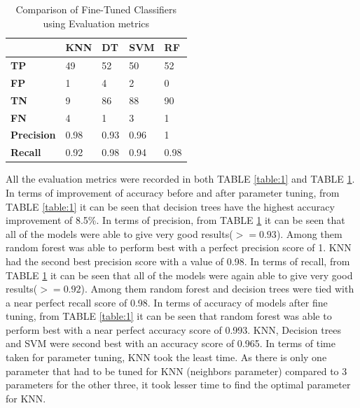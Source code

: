 \documentclass[journal]{IEEEtran}
\begin{document}
\begin{table}[htbp]
\centering
\setlength{\tabcolsep}{15pt}
\renewcommand{\arraystretch}{2}
\begin{tabular}{|l|l|l|l|l|}
\hline
                   & \textbf{KNN} & \textbf{DT} & \textbf{SVM} & \textbf{RF} \\ \hline
\textbf{TP}        & 49           & 52          & 50           & 52          \\ \hline
\textbf{FP}        & 1            & 4           & 2            & 0           \\ \hline
\textbf{TN}        & 9            & 86          & 88           & 90          \\ \hline
\textbf{FN}        & 4            & 1           & 3            & 1           \\ \hline
\textbf{Precision} & 0.98         & 0.93        & 0.96         & 1           \\ \hline
\textbf{Recall}    & 0.92         & 0.98        & 0.94         & 0.98        \\ \hline
\end{tabular}
\caption{Comparison of Fine-Tuned Classifiers using Evaluation metrics}
\label{table:2}
\end{table}

All the evaluation metrics were recorded in both TABLE \ref{table:1} and TABLE \ref{table:2}. In terms of improvement of accuracy before and after parameter tuning, from TABLE \ref{table:1} it can be seen that decision trees have the highest accuracy improvement of 8.5\%. In terms of precision, from TABLE \ref{table:2} it can be seen that all of the models were able to give very good results($>=0.93$). Among them random forest was able to perform best with a perfect precision score of 1. KNN had the second best precision score with a value of 0.98. In terms of recall, from TABLE \ref{table:2} it can be seen that all of the models were again able to give very good results($>=0.92$). Among them random forest and decision trees were tied with a near perfect recall score of 0.98. In terms of accuracy of models after fine tuning, from TABLE \ref{table:1} it can be seen that random forest was able to perform best with a near perfect accuracy score of 0.993. KNN, Decision trees and SVM were second best with an accuracy score of 0.965. In terms of time taken for parameter tuning, KNN took the least time. As there is only one parameter that had to be tuned for KNN (neighbors parameter) compared to 3 parameters for the other three, it took lesser time to find the optimal parameter for KNN.\\
\end{document}
